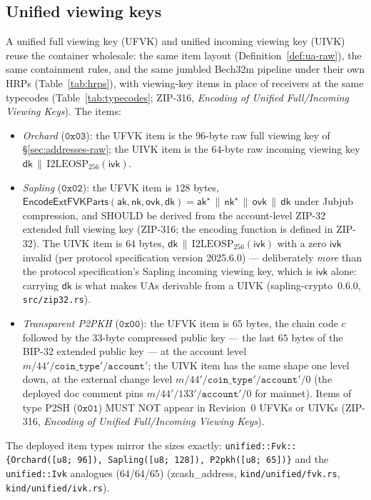 \documentclass[11pt,a4paper]{article}
\theoremstyle{definition}
\newcommand{\aksym}{\ensuremath{\mathsf{ak}}}
\newcommand{\nksym}{\ensuremath{\mathsf{nk}}}
\newcommand{\ivk}{\ensuremath{\mathsf{ivk}}}
\newcommand{\ovk}{\ensuremath{\mathsf{ovk}}}
\newcommand{\dk}{\ensuremath{\mathsf{dk}}}
\begin{document}
\subsection{Unified viewing keys}\label{sec:addresses-uvk}

A unified full viewing key (UFVK) and unified incoming viewing key (UIVK)
reuse the container wholesale: the same item layout
(Definition~\ref{def:ua-raw}), the same containment rules, and the same
jumbled Bech32m pipeline under their own HRPs
(Table~\ref{tab:hrps}), with viewing-key items in place of receivers at
the same typecodes (Table~\ref{tab:typecodes}; ZIP-316, \emph{Encoding of
Unified Full/Incoming Viewing Keys}). The items:

\begin{itemize}[leftmargin=*]
\item \emph{Orchard} ($\mathtt{0x03}$): the UFVK item is the $96$-byte raw
full viewing key of \S\ref{sec:addresses-raw}; the UIVK item is the
$64$-byte raw incoming viewing key $\dk \,\|\,
\mathrm{I2LEOSP}_{256}(\ivk)$.
\item \emph{Sapling} ($\mathtt{0x02}$): the UFVK item is $128$ bytes,
$\mathsf{EncodeExtFVKParts}(\aksym, \nksym, \ovk, \dk) =
\aksym^\star \,\|\, \nksym^\star \,\|\, \ovk \,\|\, \dk$ under Jubjub
compression, and SHOULD be derived from the account-level ZIP-32 extended
full viewing key (ZIP-316; the encoding function is defined in ZIP-32).
The UIVK item is $64$ bytes, $\dk \,\|\, \mathrm{I2LEOSP}_{256}(\ivk)$
with a zero $\ivk$ invalid (per protocol specification version 2025.6.0)
--- deliberately \emph{more} than the protocol specification's Sapling
incoming viewing key, which is $\ivk$ alone: carrying $\dk$ is what makes
UAs derivable from a UIVK (\textsf{sapling-crypto}~0.6.0,
\texttt{src/zip32.rs}).
\item \emph{Transparent P2PKH} ($\mathtt{0x00}$): the UFVK item is $65$
bytes, the chain code $c$ followed by the $33$-byte compressed public key
--- the last $65$ bytes of the BIP-32 extended public key --- at the
account level $m/44'/\mathtt{coin\_type}'/\mathtt{account}'$; the UIVK
item has the same shape one level down, at the external change level
$m/44'/\mathtt{coin\_type}'/\mathtt{account}'/0$ (the deployed doc comment
pins $m/44'/133'/\mathtt{account}'/0$ for mainnet). Items of type P2SH
($\mathtt{0x01}$) MUST NOT appear in Revision~0 UFVKs or UIVKs (ZIP-316,
\emph{Encoding of Unified Full/Incoming Viewing Keys}).
\end{itemize}

The deployed item types mirror the sizes exactly:
\texttt{unified::Fvk::\{Orchard([u8;\,96]), Sapling([u8;\,128]),
P2pkh([u8;\,65])\}} and the \texttt{unified::Ivk} analogues
($64$/$64$/$65$) (\textsf{zcash\_address}, \texttt{kind/unified/fvk.rs},
\texttt{kind/unified/ivk.rs}).
\end{document}
